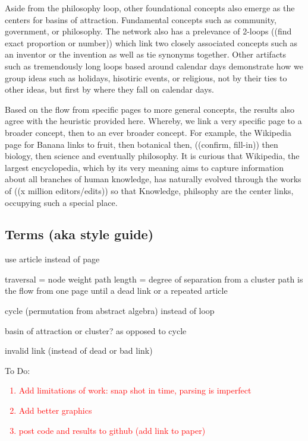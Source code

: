 \documentclass[twoside]{article}
\begin{document}
\begin{multicols}{2}
Aside from the philosophy loop, other foundational concepts also emerge as the centers for basins of attraction. Fundamental concepts such as community, government, or philosophy. The network also has a prelevance of 2-loops ((find exact proportion or number)) which link two closely associated concepts such as an inventor or the invention as well as tie synonyms together. Other artifacts such as tremendously long loops based around calendar days demonstrate how we group ideas such as holidays, hisotiric events, or religious, not by their ties to other ideas, but first by where they fall on calendar days. 


Based on the flow from specific pages to more general concepts, the results also agree with the heuristic provided here. Whereby, we link a very specific page to a broader concept, then to an ever broader concept. For example, the Wikipedia page for Banana links to fruit, then botanical then, ((confirm, fill-in)) then biology, then science and eventually philosophy. It is curious that Wikipedia, the largest encyclopedia, which by its very meaning aims to capture information about all branches of human knowledge, has naturally evolved through the works of ((x million editors/edits)) so that Knowledge, philsophy are the center links, occupying such a special place. 


\end{multicols}


\subsection{Terms (aka style guide)}

use article instead of page

traversal = node weight
path length = degree of separation from a cluster
path is the flow from one page until a dead link or a repeated article

cycle (permutation from abstract algebra) instead of loop

basin of attraction or cluster? as opposed to cycle

invalid link (instead of dead or bad link)


To Do:
\textcolor{red}{
\begin{enumerate}
    \item Add limitations of work: snap shot in time, parsing is imperfect
    \item Add better graphics
    \item post code and results to github (add link to paper)
\end{enumerate}}
\end{document}
